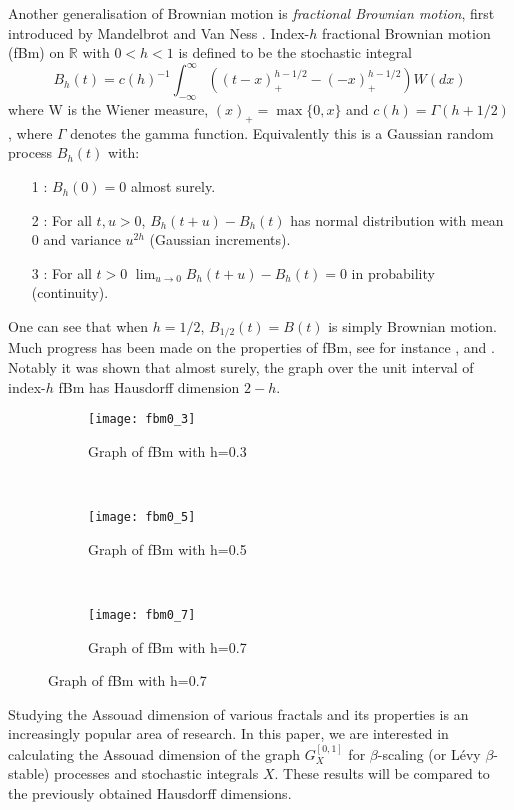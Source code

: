 Another generalisation of Brownian motion is \emph{fractional Brownian motion}, first introduced by Mandelbrot and Van Ness \cite{MVN}. Index-$h$ fractional Brownian motion (fBm) on $\mathbb{R}$ with $0<h<1$ is defined to be the stochastic integral 
\[
B_h (t) = c(h)^{-1} \int_{-\infty}^\infty \left(\left( t-x \right)_+^{h-1/2} - (-x)_+^{h-1/2} \right)W(dx)
\]
where W is the Wiener measure, $(x)_+ = \max\{0,x\}$ and $c(h) = \Gamma(h+1/2)$, where $\Gamma$ denotes the gamma function. Equivalently this is a Gaussian random process $B_h(t)$ with:
\begin{itemize}
	\item[1]: $B_h(0)=0$ almost surely.
	\item[2]: For all $t,u>0$, $B_h(t+u)-B_h(t)$ has normal distribution with mean 0 and variance $u^{2h}$ (Gaussian increments).
	\item[3]: For all $t>0$ $\lim_{u\to 0} B_h(t+u)-B_h(t)=0$ in probability (continuity).
\end{itemize}
One can see that when $h=1/2$, $B_{1/2}(t) = B(t)$ is simply Brownian motion. Much progress has been made on the properties of fBm, see for instance \cite{Ad},\cite{Ka} and \cite{Fa2}. Notably it was shown that almost surely, the graph over the unit interval of index-$h$ fBm has Hausdorff dimension $2-h$. 

\begin{figure}[h]
	\centering
	\begin{subfigure}[b]{0.3\textwidth}
		\texttt{[image: fbm0\_3]}
		\caption{Graph of fBm with h=0.3}
		\label{fig:fbm3}
	\end{subfigure}
	~ %
	\begin{subfigure}[b]{0.3\textwidth}
		\texttt{[image: fbm0\_5]}
		\caption{Graph of fBm with h=0.5}
		\label{fig:fbm5}
	\end{subfigure}
	~ %
	\begin{subfigure}[b]{0.3\textwidth}
		\texttt{[image: fbm0\_7]}
		\caption{Graph of fBm with h=0.7}
		\label{fig:fbm7}
	\end{subfigure}
\end{figure}



Studying the Assouad dimension of various fractals and its properties is an increasingly popular area of research. In this paper, we are interested in calculating the Assouad dimension of the graph $G_X^{[0,1]}$ for $\beta$-scaling (or L\'{e}vy $\beta$-stable) processes and stochastic integrals $X$. These results will be compared to the previously obtained Hausdorff dimensions.

